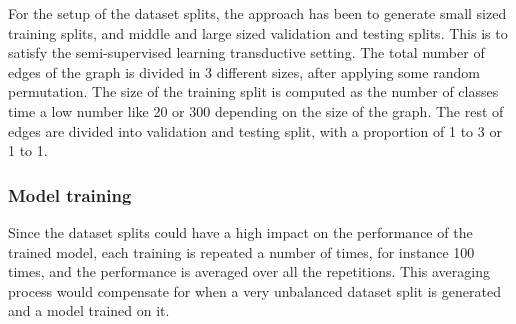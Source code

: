 

For the setup of the dataset splits, the approach has been to generate small sized training splits, and middle and large sized validation and testing splits. This is to satisfy the semi-supervised learning transductive setting. The total number of edges of the graph is divided in 3 different sizes, after applying some random permutation. The size of the training split is computed as the number of classes time a low number like 20 or 300 depending on the size of the graph. The rest of edges are divided into validation and testing split, with a proportion of 1 to 3 or 1 to 1. 




\subsubsection{Model training}

Since the dataset splits could have a high impact on the performance of the trained model, each training is repeated a number of times, for instance 100 times, and the performance is averaged over all the repetitions. This averaging process would compensate for when a very unbalanced dataset split is generated and a model trained on it.



